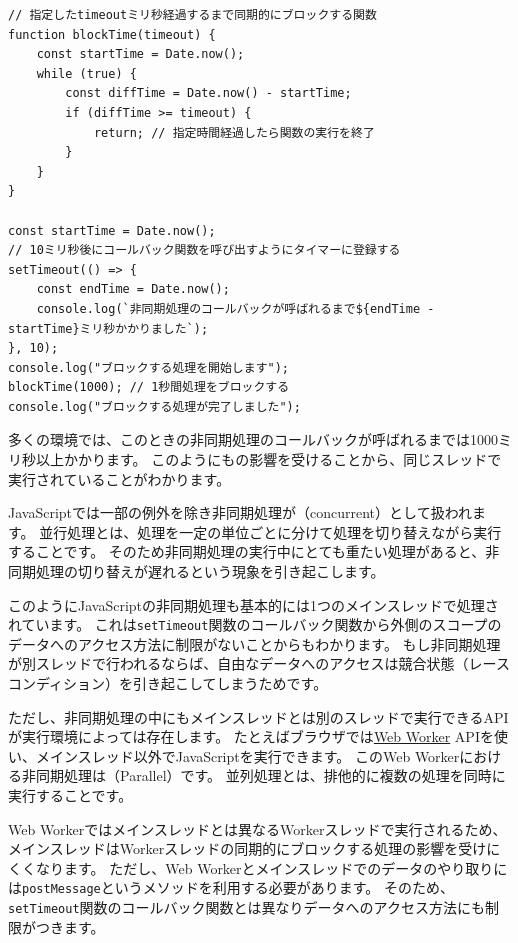 \begin{lstlisting}
// 指定したtimeoutミリ秒経過するまで同期的にブロックする関数
function blockTime(timeout) { 
    const startTime = Date.now();
    while (true) {
        const diffTime = Date.now() - startTime;
        if (diffTime >= timeout) {
            return; // 指定時間経過したら関数の実行を終了
        }
    }
}

const startTime = Date.now();
// 10ミリ秒後にコールバック関数を呼び出すようにタイマーに登録する
setTimeout(() => {
    const endTime = Date.now();
    console.log(`非同期処理のコールバックが呼ばれるまで${endTime - startTime}ミリ秒かかりました`);
}, 10);
console.log("ブロックする処理を開始します");
blockTime(1000); // 1秒間処理をブロックする
console.log("ブロックする処理が完了しました");
\end{lstlisting}

多くの環境では、このときの非同期処理のコールバックが呼ばれるまでは1000ミリ秒以上かかります。
このように\textbf{}も\textbf{}の影響を受けることから、同じスレッドで実行されていることがわかります。

JavaScriptでは一部の例外を除き非同期処理が\textbf{}（concurrent）として扱われます。
並行処理とは、処理を一定の単位ごとに分けて処理を切り替えながら実行することです。
そのため非同期処理の実行中にとても重たい処理があると、非同期処理の切り替えが遅れるという現象を引き起こします。

このようにJavaScriptの非同期処理も基本的には1つのメインスレッドで処理されています。
これは\texttt{setTimeout}関数のコールバック関数から外側のスコープのデータへのアクセス方法に制限がないことからもわかります。
もし非同期処理が別スレッドで行われるならば、自由なデータへのアクセスは競合状態（レースコンディション）を引き起こしてしまうためです。

ただし、非同期処理の中にもメインスレッドとは別のスレッドで実行できるAPIが実行環境によっては存在します。
たとえばブラウザでは\href{https://developer.mozilla.org/ja/docs/Web/API/Web_Workers_API/Using_web_workers}{Web
Worker} APIを使い、メインスレッド以外でJavaScriptを実行できます。
このWeb Workerにおける非同期処理は\textbf{}（Parallel）です。
並列処理とは、排他的に複数の処理を同時に実行することです。

Web
Workerではメインスレッドとは異なるWorkerスレッドで実行されるため、メインスレッドはWorkerスレッドの同期的にブロックする処理の影響を受けにくくなります。
ただし、Web
Workerとメインスレッドでのデータのやり取りには\texttt{postMessage}というメソッドを利用する必要があります。
そのため、\texttt{setTimeout}関数のコールバック関数とは異なりデータへのアクセス方法にも制限がつきます。

